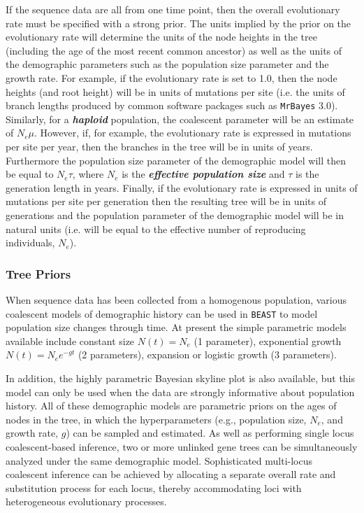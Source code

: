 \documentclass[cup7b, english]{cupbook}
\begin{document}
If the sequence data are all from one time point, then the overall
evolutionary rate must be specified with a strong prior. The units
implied by the prior on the evolutionary rate will determine the units
of the node heights in the tree (including the age of the most recent
common ancestor) as well as the units of the demographic parameters
such as the population size parameter and the growth rate. For example,
if the evolutionary rate is set to 1.0, then the node heights (and
root height) will be in units of mutations per site (i.e. the units
of branch lengths produced by common software packages such as \texttt{MrBayes}
3.0). Similarly, for a \textbf{\textit{haploid}} population, the coalescent parameter
will be an estimate of $N_{e}\mu$. However, if, for example, the
evolutionary rate is expressed in mutations per site per year, then
the branches in the tree will be in units of years. Furthermore the
population size parameter of the demographic model will then be equal
to $N_{e}\tau$, where $N_{e}$ is the \textbf{\textit{effective population size}} and
$\tau$ is the generation length in years. Finally, if the evolutionary
rate is expressed in units of mutations per site per generation then
the resulting tree will be in units of generations and the population
parameter of the demographic model will be in natural units (i.e.
will be equal to the effective number of reproducing individuals,
$N_{e}$).

\subsubsection{Tree Priors}

When sequence data has been collected from a homogenous population,
various coalescent \cite{Kingman1982,GT1994} models of demographic
history can be used in \texttt{BEAST} to model population size changes through
time. At present the simple parametric models available include constant
size $N(t)=N_{e}$ (1 parameter), exponential growth $N(t)=N_{e}e^{-gt}$
(2 parameters), expansion or logistic growth (3 parameters).

In addition, the highly parametric Bayesian skyline plot \cite{DRSP2005}
is also available, but this model can only be used when the data are
strongly informative about population history. All of these demographic
models are parametric priors on the ages of nodes in the tree, in
which the hyperparameters (e.g., population size, $N_{e}$, and growth
rate, $g$) can be sampled and estimated. As well as performing single
locus coalescent-based inference, two or more unlinked gene trees
can be simultaneously analyzed under the same demographic model. Sophisticated
multi-locus coalescent inference can be achieved by allocating a separate
overall rate and substitution process for each locus, thereby accommodating
loci with heterogeneous evolutionary processes.
\end{document}
